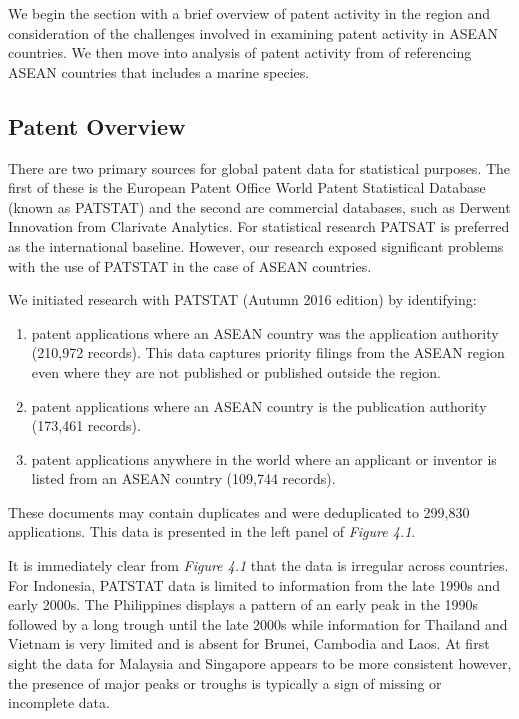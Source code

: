 \documentclass[]{book}
\providecommand{\tightlist}{%
  \setlength{\itemsep}{0pt}\setlength{\parskip}{0pt}}
\theoremstyle{definition}
\theoremstyle{definition}
\theoremstyle{definition}
\theoremstyle{remark}
\begin{document}
We begin the section with a brief overview of patent activity in the
region and consideration of the challenges involved in examining patent
activity in ASEAN countries. We then move into analysis of patent
activity from of referencing ASEAN countries that includes a marine
species.

\hypertarget{patent-overview}{%
\subsection{Patent Overview}\label{patent-overview}}

There are two primary sources for global patent data for statistical
purposes. The first of these is the European Patent Office World Patent
Statistical Database (known as PATSTAT) and the second are commercial
databases, such as Derwent Innovation from Clarivate Analytics. For
statistical research PATSAT is preferred as the international baseline.
However, our research exposed significant problems with the use of
PATSTAT in the case of ASEAN countries.

We initiated research with PATSTAT (Autumn 2016 edition) by identifying:

\begin{enumerate}
\def\labelenumi{\alph{enumi})}
\tightlist
\item
  patent applications where an ASEAN country was the application
  authority (210,972 records). This data captures priority filings from
  the ASEAN region even where they are not published or published
  outside the region.
\item
  patent applications where an ASEAN country is the publication
  authority (173,461 records).
\item
  patent applications anywhere in the world where an applicant or
  inventor is listed from an ASEAN country (109,744 records).
\end{enumerate}

These documents may contain duplicates and were deduplicated to 299,830
applications. This data is presented in the left panel of \emph{Figure
4.1}.

It is immediately clear from \emph{Figure 4.1} that the data is
irregular across countries. For Indonesia, PATSTAT data is limited to
information from the late 1990s and early 2000s. The Philippines
displays a pattern of an early peak in the 1990s followed by a long
trough until the late 2000s while information for Thailand and Vietnam
is very limited and is absent for Brunei, Cambodia and Laos. At first
sight the data for Malaysia and Singapore appears to be more consistent
however, the presence of major peaks or troughs is typically a sign of
missing or incomplete data.
\end{document}
